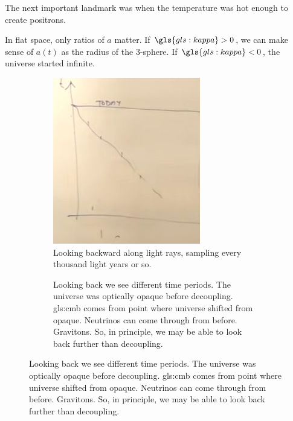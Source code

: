 \documentclass[]{article}
\begin{document}
The next important landmark was when the temperature was hot enough to create positrons.

In flat space, only ratios of $a$ matter. If $\gls{gls:kappa}>0$, we can make sense of $a(t)$ as the radius of the 3-sphere.  If $\gls{gls:kappa}<0$, the universe started infinite.

\begin{figure}[H]
	\caption{The universe in a nutshell}
	\begin{subfigure}[t]{0.45\textwidth}
		\caption{Looking backward along light rays, sampling every thousand light years or so.}
		\includegraphics[width=\textwidth]{cosmo-7-universe-1}
	\end{subfigure}
	\begin{subfigure}[t]{0.45\textwidth}
		\caption{Looking back we see different time periods. The universe was optically opaque before decoupling. \gls{gls:cmb} comes from point where universe shifted from opaque. Neutrinos can come through from before. Gravitons. So, in principle, we may be able to look back further than decoupling.}

\end{subfigure}
\end{figure}
\end{document}

